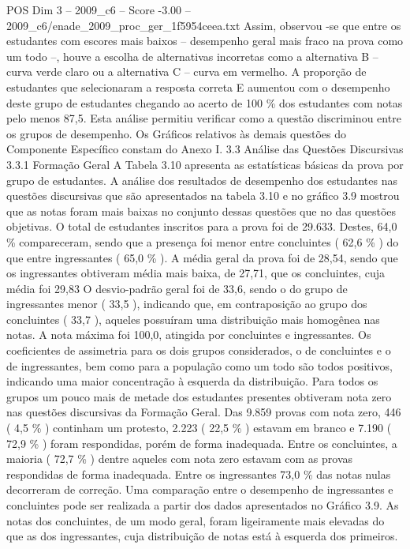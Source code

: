\begin{textsample}{POS Dim 3 – 2009\_c6 – Score -3.00 – 2009\_c6/enade\_2009\_proc\_ger\_1f5954ceea.txt}
Assim, observou -se que entre os estudantes com escores mais baixos – desempenho geral mais fraco na prova como um todo –, houve a escolha de alternativas incorretas como a alternativa B – curva verde claro ou a alternativa C – curva em vermelho.
A proporção de estudantes que selecionaram a resposta correta E aumentou com o desempenho deste grupo de estudantes chegando ao acerto de 100 \% dos estudantes com notas pelo menos 87,5.
Esta análise permitiu verificar como a questão discriminou entre os grupos de desempenho.
Os Gráficos relativos às demais questões do Componente Específico constam do Anexo I. 3.3 Análise das Questões Discursivas 3.3.1 Formação Geral A Tabela 3.10 apresenta as estatísticas básicas da prova por grupo de estudantes.
A análise dos resultados de desempenho dos estudantes nas questões discursivas que são apresentados na tabela 3.10 e no gráfico 3.9 mostrou que as notas foram mais baixas no conjunto dessas questões que no das questões objetivas.
O total de estudantes inscritos para a prova foi de 29.633.
Destes, 64,0 \% compareceram, sendo que a presença foi menor entre concluintes ( 62,6 \% ) do que entre ingressantes ( 65,0 \% ).
A média geral da prova foi de 28,54, sendo que os ingressantes obtiveram média mais baixa, de 27,71, que os concluintes, cuja média foi 29,83 O desvio-padrão geral foi de 33,6, sendo o do grupo de ingressantes menor ( 33,5 ), indicando que, em contraposição ao grupo dos concluintes ( 33,7 ), aqueles possuíram uma distribuição mais homogênea nas notas.
A nota máxima foi 100,0, atingida por concluintes e ingressantes.
Os coeficientes de assimetria para os dois grupos considerados, o de concluintes e o de ingressantes, bem como para a população como um todo são todos positivos, indicando uma maior concentração à esquerda da distribuição.
Para todos os grupos um pouco mais de metade dos estudantes presentes obtiveram nota zero nas questões discursivas da Formação Geral.
Das 9.859 provas com nota zero, 446 ( 4,5 \% ) continham um protesto, 2.223 ( 22,5 \% ) estavam em branco e 7.190 ( 72,9 \% ) foram respondidas, porém de forma inadequada.
Entre os concluintes, a maioria ( 72,7 \% ) dentre aqueles com nota zero estavam com as provas respondidas de forma inadequada.
Entre os ingressantes 73,0 \% das notas nulas decorreram de correção.
Uma comparação entre o desempenho de ingressantes e concluintes pode ser realizada a partir dos dados apresentados no Gráfico 3.9.
As notas dos concluintes, de um modo geral, foram ligeiramente mais elevadas do que as dos ingressantes, cuja distribuição de notas está à esquerda dos primeiros.

\end{textsample}
